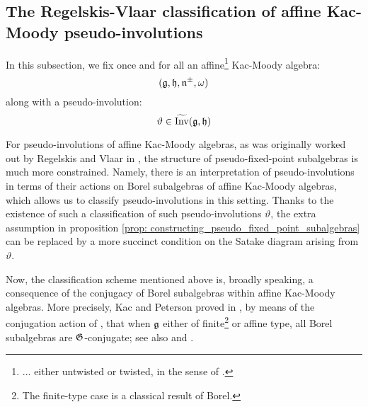     \subsection{The Regelskis-Vlaar classification of affine Kac-Moody pseudo-involutions}
        In this subsection, we fix once and for all an affine\footnote{... either untwisted or twisted, in the sense of \cite[Chapter 8]{kac_infinite_dimensional_lie_algebras}.} Kac-Moody algebra:
            $$(\mathfrak{g}, \mathfrak{h}, \mathfrak{n}^{\pm}, \omega)$$
        along with a pseudo-involution:
            $$\vartheta \in \widetilde{\operatorname{Inv}}(\mathfrak{g}, \mathfrak{h})$$
    
        For pseudo-involutions of affine Kac-Moody algebras, as was originally worked out by Regelskis and Vlaar in \cite{regelskis_vlaar_kac_moody_pseudo_symmetric_pairs}, the structure of pseudo-fixed-point subalgebras is much more constrained. Namely, there is an interpretation of pseudo-involutions in terms of their actions on Borel subalgebras of affine Kac-Moody algebras, which allows us to classify pseudo-involutions in this setting. Thanks to the existence of such a classification of such pseudo-involutions $\vartheta$, the extra assumption in proposition \ref{prop: constructing_pseudo_fixed_point_subalgebras} can be replaced by a more succinct condition on the Satake diagram arising from $\vartheta$.

        Now, the classification scheme mentioned above is, broadly speaking, a consequence of the conjugacy of Borel subalgebras within affine Kac-Moody algebras. More precisely, Kac and Peterson proved in \cite{kac_peterson_infinite_flag_varieties_and_conjugacy_of_cartan_subalgebras}, by means of the conjugation action of , that when $\mathfrak{g}$ either of finite\footnote{The finite-type case is a classical result of Borel.} or affine type, all Borel subalgebras are $\mathfrak{G}$-conjugate; see also \cite{chernousov_egorov_gille_pianzola_cohomological_proof_of_peterson_kac_theorem} and \cite{chernousov_neher_pianzola_conjugacy_of_cartan_subalgebras_in_EALAs_with_non_fgc_centreless_cores}. 
    
